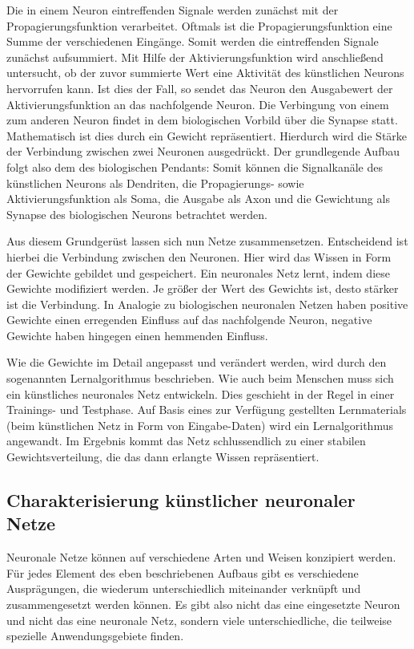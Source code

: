 Die in einem Neuron eintreffenden Signale werden zunächst mit der Propagierungsfunktion verarbeitet. Oftmals ist die Propagierungsfunktion eine Summe der verschiedenen Eingänge. Somit werden die eintreffenden Signale zunächst aufsummiert. Mit Hilfe der Aktivierungsfunktion wird anschließend untersucht, ob der zuvor summierte Wert eine Aktivität des künstlichen Neurons hervorrufen kann. Ist dies der Fall, so sendet das Neuron den Ausgabewert der Aktivierungsfunktion an das nachfolgende Neuron. Die Verbingung von einem zum anderen Neuron findet in dem biologischen Vorbild über die Synapse statt. Mathematisch ist dies durch ein Gewicht repräsentiert. Hierdurch wird die Stärke der Verbindung zwischen zwei Neuronen ausgedrückt. Der grundlegende Aufbau folgt also dem des biologischen Pendants: Somit können die Signalkanäle des künstlichen Neurons als Dendriten, die Propagierungs- sowie Aktivierungsfunktion als Soma, die Ausgabe als Axon und die Gewichtung als Synapse des biologischen Neurons betrachtet werden.

Aus diesem Grundgerüst lassen sich nun Netze zusammensetzen. Entscheidend ist hierbei die Verbindung zwischen den Neuronen. Hier wird das Wissen in Form der Gewichte gebildet und gespeichert. Ein neuronales Netz lernt, indem diese Gewichte modifiziert werden. Je größer der Wert des Gewichts ist, desto stärker ist die Verbindung. In Analogie zu biologischen neuronalen Netzen haben positive Gewichte einen erregenden Einfluss auf das nachfolgende Neuron, negative Gewichte haben hingegen einen hemmenden Einfluss.\,

Wie die Gewichte im Detail angepasst und verändert werden, wird durch den sogenannten Lernalgorithmus beschrieben. Wie auch beim Menschen muss sich ein künstliches neuronales Netz entwickeln. Dies geschieht in der Regel in einer Trainings- und Testphase. Auf Basis eines zur Verfügung gestellten Lernmaterials (beim künstlichen Netz in Form von Eingabe-Daten) wird ein Lernalgorithmus angewandt. Im Ergebnis kommt das Netz schlussendlich zu einer stabilen Gewichtsverteilung, die das dann erlangte Wissen repräsentiert.



\subsection{Charakterisierung künstlicher neuronaler Netze}\label{sec:char}

Neuronale Netze können auf verschiedene Arten und Weisen konzipiert werden. Für jedes Element des eben beschriebenen Aufbaus gibt es verschiedene Ausprägungen, die wiederum unterschiedlich miteinander verknüpft und zusammengesetzt werden können. Es gibt also nicht das eine eingesetzte Neuron und nicht das eine neuronale Netz, sondern viele unterschiedliche, die teilweise spezielle Anwendungsgebiete finden.

